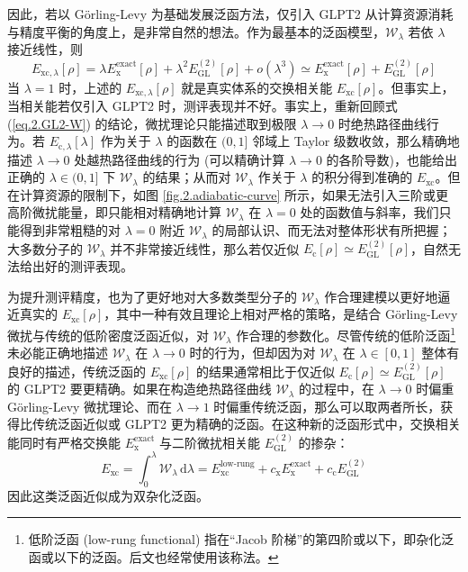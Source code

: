 因此，若以 G\"orling-Levy 为基础发展泛函方法，仅引入 GLPT2 从计算资源消耗与精度平衡的角度上，是非常自然的想法。作为最基本的泛函模型，$\mathcal{W}_{\lambda}$ 若依 $\lambda$ 接近线性，则
\begin{equation}
  E_{\mathrm{xc}, \lambda} [\rho] = \lambda E_\mathrm{x}^\mathrm{exact}[\rho] + \lambda^2 E_\mathrm{GL}^{(2)} [\rho] + o(\lambda^3) \simeq E_\mathrm{x}^\mathrm{exact}[\rho] + E_\mathrm{GL}^{(2)} [\rho]
\end{equation}
当 $\lambda = 1$ 时，上述的 $E_{\mathrm{xc}, \lambda} [\rho]$ 就是真实体系的交换相关能 $E_{\mathrm{xc}} [\rho]$。但事实上，当相关能若仅引入 GLPT2 时，测评表现并不好\cite{Su-Xu.JCP.2014}。事实上，重新回顾式 (\ref{eq.2.GL2-W}) 的结论，微扰理论只能描述取到极限 $\lambda \rightarrow 0$ 时绝热路径曲线行为。若 $E_{\mathrm{c}, \lambda} [\lambda]$ 作为关于 $\lambda$ 的函数在 $(0, 1]$ 邻域上 Taylor 级数收敛，那么精确地描述 $\lambda \rightarrow 0$ 处越热路径曲线的行为 (可以精确计算 $\lambda \rightarrow 0$ 的各阶导数)，也能给出正确的 $\lambda \in (0, 1]$ 下 $\mathcal{W}_{\lambda}$ 的结果；从而对 $\mathcal{W}_{\lambda}$ 作关于 $\lambda$ 的积分得到准确的 $E_\mathrm{xc}$。但在计算资源的限制下，如图 \ref{fig.2.adiabatic-curve} 所示，如果无法引入三阶或更高阶微扰能量，即只能相对精确地计算 $\mathcal{W}_{\lambda}$ 在 $\lambda = 0$ 处的函数值与斜率，我们只能得到非常粗糙的对 $\lambda = 0$ 附近 $\mathcal{W}_{\lambda}$ 的局部认识、而无法对整体形状有所把握；大多数分子的 $\mathcal{W}_{\lambda}$ 并不非常接近线性，那么若仅近似 $E_\mathrm{c} [\rho] \simeq E_\mathrm{GL}^{(2)} [\rho]$，自然无法给出好的测评表现。

为提升测评精度，也为了更好地对大多数类型分子的 $\mathcal{W}_{\lambda}$ 作合理建模以更好地逼近真实的 $E_\mathrm{xc} [\rho]$，其中一种有效且理论上相对严格的策略，是结合 G\"orling-Levy 微扰与传统的低阶密度泛函近似，对 $\mathcal{W}_{\lambda}$ 作合理的参数化。尽管传统的低阶泛函\footnote{低阶泛函 (low-rung functional) 指在“Jacob 阶梯”的第四阶或以下，即杂化泛函或以下的泛函。后文也经常使用该称法。}未必能正确地描述 $\mathcal{W}_{\lambda}$ 在 $\lambda \rightarrow 0$ 时的行为，但却因为对 $\mathcal{W}_{\lambda}$ 在 $\lambda \in [0, 1]$ 整体有良好的描述，传统泛函的 $E_\mathrm{xc} [\rho]$ 的结果通常相比于仅近似 $E_\mathrm{c} [\rho] \simeq E_\mathrm{GL}^{(2)} [\rho]$ 的 GLPT2 要更精确。如果在构造绝热路径曲线 $\mathcal{W}_{\lambda}$ 的过程中，在 $\lambda \rightarrow 0$ 时偏重 G\"orling-Levy 微扰理论、而在 $\lambda \rightarrow 1$ 时偏重传统泛函，那么可以取两者所长，获得比传统泛函近似或 GLPT2 更为精确的泛函。在这种新的泛函形式中，交换相关能同时有严格交换能 $E_\mathrm{x}^\mathrm{exact}$ 与二阶微扰相关能 $E_\mathrm{GL}^{(2)}$ 的掺杂：
\begin{equation}
  E_\mathrm{xc} = \int_0^\lambda \mathcal{W}_{\lambda} \, \mathrm{d} \lambda = E_\mathrm{xc}^\text{low-rung} + c_\mathrm{x} E_\mathrm{x}^\mathrm{exact} + c_\mathrm{c} E_\mathrm{GL}^{(2)}
\end{equation}
因此这类泛函近似成为双杂化泛函。

